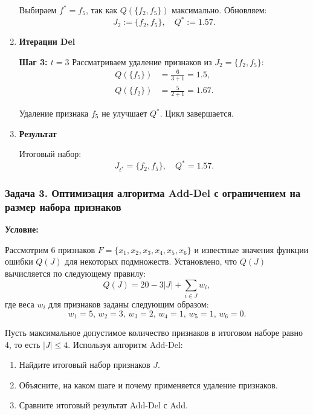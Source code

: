 \begin{enumerate}
          Выбираем \( f^* = f_5 \), так как \( Q(\{f_2, f_5\}) \) максимально.
          Обновляем:
          \[
              J_2 := \{f_2, f_5\}, \quad Q^* := 1.57.
          \]

    \item \textbf{Итерации Del}

          \textbf{Шаг 3: \( t = 3 \)}
          Рассматриваем удаление признаков из \( J_2 = \{f_2, f_5\} \):
          \[
              \begin{aligned}
                  Q(\{f_5\}) & = \frac{6}{3 + 1} = 1.5,  \\
                  Q(\{f_2\}) & = \frac{5}{2 + 1} = 1.67.
              \end{aligned}
          \]

          Удаление признака \( f_5 \) не улучшает \( Q^* \). Цикл завершается.

    \item \textbf{Результат}

          Итоговый набор:
          \[
              J_{t^*} = \{f_2, f_5\}, \quad Q^* = 1.57.
          \]

\end{enumerate}





\bigskip

\subsubsection*{Задача 3. Оптимизация алгоритма Add-Del с ограничением на размер набора признаков}

\textbf{Условие:}

Рассмотрим 6 признаков $F = \{x_1, x_2, x_3, x_4, x_5, x_6\}$ и известные значения функции ошибки $Q(J)$ для некоторых подмножеств. Установлено, что $Q(J)$ вычисляется по следующему правилу:
\[
    Q(J) = 20 - 3|J| + \sum_{i \in J} w_i,
\]
где веса $w_i$ для признаков заданы следующим образом:
\[
    w_1 = 5, \, w_2 = 3, \, w_3 = 2, \, w_4 = 1, \, w_5 = 1, \, w_6 = 0.
\]

Пусть максимальное допустимое количество признаков в итоговом наборе равно 4, то есть $|J| \leq 4$. Используя алгоритм Add-Del:
\begin{enumerate}
    \item Найдите итоговый набор признаков $J$.
    \item Объясните, на каком шаге и почему применяется удаление признаков.
    \item Сравните итоговый результат Add-Del с Add.
\end{enumerate}

